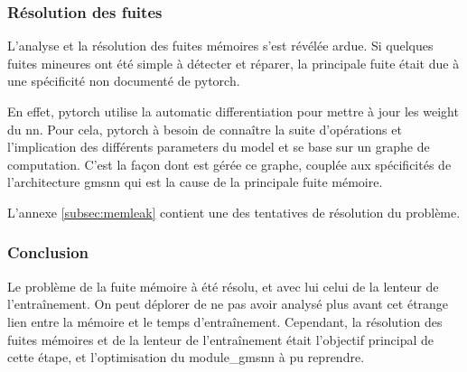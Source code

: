 \subsubsection{Résolution des fuites}
L'analyse et la résolution des fuites mémoires s'est révélée ardue. Si quelques fuites mineures ont été simple à détecter et réparer, la principale fuite était due à une spécificité non documenté de \gls{pytorch}.

En effet, \gls{pytorch} utilise la \gls{automatic differentiation} pour mettre à jour les \gls{weight} du \gls{nn}.
Pour cela, \gls{pytorch} à besoin de connaître la suite d'opérations et l'implication des différents \glspl{parameter} du \gls{model} et se base sur un \og graphe de computation\fg{}.
C'est la façon dont est gérée ce graphe, couplée aux spécificités de l'architecture \gls{gmsnn} qui est la cause de la principale fuite mémoire.

L'annexe \ref{subsec:memleak} contient une des tentatives de résolution du problème.


\subsubsection{Conclusion}
Le problème de la fuite mémoire à été résolu, et avec lui celui de la lenteur de l'entraînement.
On peut déplorer de ne pas avoir analysé plus avant cet étrange lien entre la mémoire et le temps d'entraînement.
Cependant, la résolution des fuites mémoires et de la lenteur de l'entraînement était l'objectif principal de cette étape, et l'optimisation du \gls{module_gmsnn} à pu reprendre.